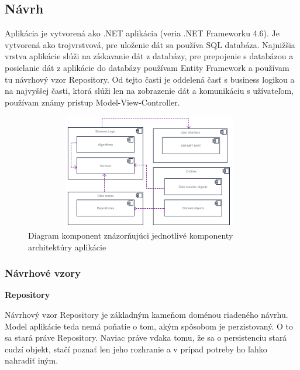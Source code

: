 \documentclass[slovak,master,public,dept460,male,cpdeclaration,oneside]{diploma}
\begin{document}
\subsection{Návrh}
Aplikácia je vytvorená ako .NET aplikácia (veria .NET Frameworku 4.6). Je vytvorená ako trojvrstvová, pre uloženie dát sa používa SQL databáza. Najnižšia vrstva aplikácie slúži na získavanie dát z databázy, pre prepojenie s databázou a posielanie dát z aplikácie do databázy používam Entity Framework a používam tu návrhový vzor Repository. Od tejto časti je oddelená časť s business logikou a na najvyššej časti, ktorá slúži len na zobrazenie dát a komunikáciu s užívateľom, používam známy prístup Model-View-Controller.


\begin{figure}[H]
\centering
\includegraphics[width=11cm, height=5cm]{figures/diagram_komponent}
\caption{Diagram komponent znázorňujúci jednotlivé komponenty architektúry aplikácie}
\end{figure}

\subsubsection{Návrhové vzory}

\indent
\indent \textbf{Repository}

Návrhový vzor Repository je základným kameňom doménou riadeného návrhu. Model aplikácie teda nemá poňatie o tom, akým spôsobom je perzistovaný. O to sa stará práve Repository. Naviac práve vďaka tomu, že sa o persistenciu stará cudzí objekt, stačí poznať len jeho rozhranie a v prípad potreby ho ľahko nahradiť iným. \cite{11}
\end{document}
